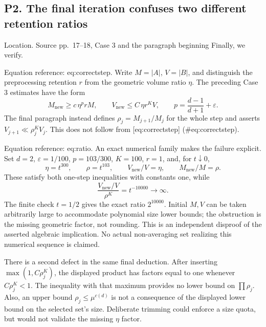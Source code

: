 \documentclass[10pt]{article}
\begin{document}
\subsection*{P2. The final iteration confuses two different retention ratios}
Location. Source pp. 17–18, Case 3 and the paragraph beginning Finally, we verify.\par
Equation reference: eq:correctstep. Write \(M=|A|\), \(V=|B|\), and distinguish the preprocessing retention \(r\) from the geometric volume ratio \(\eta\). The preceding Case 3 estimates have the form \[
 M_{\mathrm{new}}\ge c\,\eta^p rM,\qquad
 V_{\mathrm{new}}\le C\,\eta r^K V,\qquad
 p=\frac{d-1}{d+1}+\varepsilon.\] The final paragraph instead defines \(\rho_j=M_{j+1}/M_j\) for the whole step and asserts \(V_{j+1}\ll\rho_j^K V_j\). This does not follow from [eq:correctstep] (\#eq:correctstep).\par
Equation reference: eq:ratio. An exact numerical family makes the failure explicit. Set \(d=2\), \(\varepsilon=1/100\), \(p=103/300\), \(K=100\), \(r=1\), and, for \(t\downarrow0\), \[\eta=t^{300},\qquad \rho=t^{103},\qquad
 V_{\mathrm{new}}/V=\eta,\qquad M_{\mathrm{new}}/M=\rho.\] These satisfy both one-step inequalities with constants one, while \[
 \frac{V_{\mathrm{new}}/V}{\rho^K}=t^{-10000}\longrightarrow\infty.\] The finite check \(t=1/2\) gives the exact ratio \(2^{10000}\). Initial \(M,V\) can be taken arbitrarily large to accommodate polynomial size lower bounds; the obstruction is the missing geometric factor, not rounding. This is an independent disproof of the asserted algebraic implication. No actual non-averaging set realizing this numerical sequence is claimed.\par
There is a second defect in the same final deduction. After inserting \(\max(1,C\rho_j^K)\), the displayed product has factors equal to one whenever \(C\rho_j^K<1\). The inequality with that maximum provides no lower bound on \(\prod\rho_j\). Also, an upper bound \(\rho_j\le\mu^{c(d)}\) is not a consequence of the displayed lower bound on the selected set’s size. Deliberate trimming could enforce a size quota, but would not validate the missing \(\eta\) factor.\par
\end{document}
